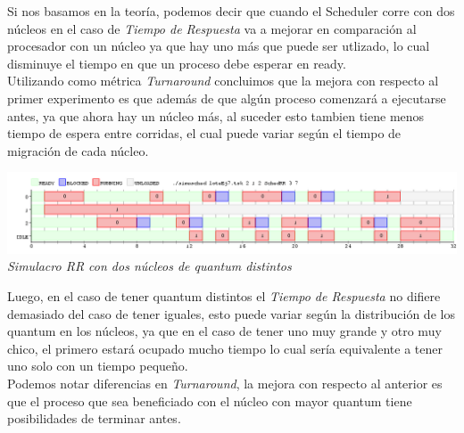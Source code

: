 Si nos basamos en la teor\'ia, podemos decir que cuando el Scheduler corre con dos n\'ucleos en el caso de \textit{Tiempo de Respuesta} va a mejorar en comparaci\'on al procesador con un n\'ucleo ya que hay uno m\'as que puede ser utlizado, lo cual disminuye el tiempo en que un proceso debe esperar en ready.\\
Utilizando como m\'etrica \textit{Turnaround} concluimos que la mejora con respecto al primer experimento es que adem\'as de que alg\'un proceso comenzar\'a a ejecutarse antes, ya que ahora  hay un n\'ucleo m\'as, al suceder esto tambien tiene menos tiempo de espera entre corridas, el cual puede variar seg\'un el tiempo de migraci\'on de cada n\'ucleo.


\vspace{\baselineskip}
\begin{center}
\includegraphics[scale=0.45]{../tp1/Test/resEj7Co2dis.png}
\\
\vspace{1pt}
\footnotesize\textit{Simulacro RR con dos n\'ucleos de quantum distintos}
\end{center}
\vspace{\baselineskip}

Luego, en el caso de tener quantum distintos el \textit{Tiempo de Respuesta} no difiere demasiado del caso de tener iguales, esto puede variar seg\'un la distribuci\'on de los quantum en los n\'ucleos, ya que en el caso de tener uno muy grande y otro muy chico, el primero estar\'a ocupado mucho tiempo lo cual ser\'ia equivalente a tener uno solo con un tiempo peque\~no.\\
Podemos notar diferencias en \textit{Turnaround}, la mejora con respecto al anterior es que el proceso que sea beneficiado con el n\'ucleo con mayor quantum tiene posibilidades de terminar antes.


